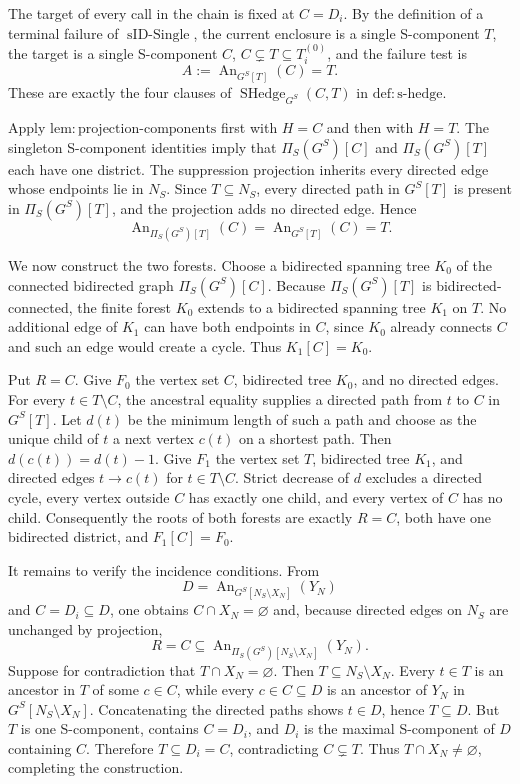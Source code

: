 The target of every call in the chain is fixed at \(C=D_i\). By the definition of a terminal failure of \(\operatorname{sID\text{-}Single}\), the current enclosure is a single S-component \(T\), the target is a single S-component \(C\), \(C\subsetneq T\subseteq T_i^{(0)}\), and the failure test is
\[
 A:=\operatorname{An}_{G^S[T]}(C)=T.
\]
These are exactly the four clauses of \(\operatorname{SHedge}_{G^S}(C,T)\) in \(\mathrm{def:s\text{-}hedge}\).

Apply \(\mathrm{lem:projection\text{-}components}\) first with \(H=C\) and then with \(H=T\). The singleton S-component identities imply that \(\Pi_S(G^S)[C]\) and \(\Pi_S(G^S)[T]\) each have one district. The suppression projection inherits every directed edge whose endpoints lie in \(N_S\). Since \(T\subseteq N_S\), every directed path in \(G^S[T]\) is present in \(\Pi_S(G^S)[T]\), and the projection adds no directed edge. Hence
\[
 \operatorname{An}_{\Pi_S(G^S)[T]}(C)
 =\operatorname{An}_{G^S[T]}(C)=T.
\]

We now construct the two forests. Choose a bidirected spanning tree \(K_0\) of the connected bidirected graph \(\Pi_S(G^S)[C]\). Because \(\Pi_S(G^S)[T]\) is bidirected-connected, the finite forest \(K_0\) extends to a bidirected spanning tree \(K_1\) on \(T\). No additional edge of \(K_1\) can have both endpoints in \(C\), since \(K_0\) already connects \(C\) and such an edge would create a cycle. Thus \(K_1[C]=K_0\).

Put \(R=C\). Give \(F_0\) the vertex set \(C\), bidirected tree \(K_0\), and no directed edges. For every \(t\in T\setminus C\), the ancestral equality supplies a directed path from \(t\) to \(C\) in \(G^S[T]\). Let \(d(t)\) be the minimum length of such a path and choose as the unique child of \(t\) a next vertex \(c(t)\) on a shortest path. Then \(d(c(t))=d(t)-1\). Give \(F_1\) the vertex set \(T\), bidirected tree \(K_1\), and directed edges \(t\to c(t)\) for \(t\in T\setminus C\). Strict decrease of \(d\) excludes a directed cycle, every vertex outside \(C\) has exactly one child, and every vertex of \(C\) has no child. Consequently the roots of both forests are exactly \(R=C\), both have one bidirected district, and \(F_1[C]=F_0\).

It remains to verify the incidence conditions. From
\[
 D=\operatorname{An}_{G^S[N_S\setminus X_N]}(Y_N)
\]
and \(C=D_i\subseteq D\), one obtains \(C\cap X_N=\varnothing\) and, because directed edges on \(N_S\) are unchanged by projection,
\[
 R=C\subseteq
 \operatorname{An}_{\Pi_S(G^S)[N_S\setminus X_N]}(Y_N).
\]
Suppose for contradiction that \(T\cap X_N=\varnothing\). Then \(T\subseteq N_S\setminus X_N\). Every \(t\in T\) is an ancestor in \(T\) of some \(c\in C\), while every \(c\in C\subseteq D\) is an ancestor of \(Y_N\) in \(G^S[N_S\setminus X_N]\). Concatenating the directed paths shows \(t\in D\), hence \(T\subseteq D\). But \(T\) is one S-component, contains \(C=D_i\), and \(D_i\) is the maximal S-component of \(D\) containing \(C\). Therefore \(T\subseteq D_i=C\), contradicting \(C\subsetneq T\). Thus \(T\cap X_N\ne\varnothing\), completing the construction.